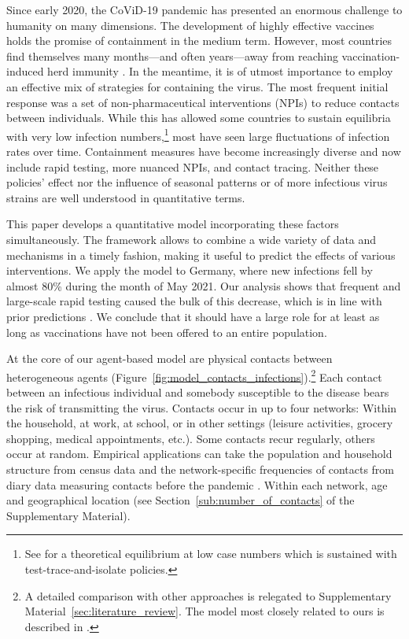 Since early 2020, the CoViD-19 pandemic has
presented an enormous challenge to humanity on many dimensions. The development of highly
effective vaccines holds the promise of containment in the medium term. However, most
countries find themselves many months---and often years---away from reaching
vaccination-induced herd immunity \citep{Swaminathan2021}. In the meantime, it is of utmost
importance to employ an effective mix of strategies for containing the virus. The most
frequent initial response was a set of non-pharmaceutical interventions (NPIs) to reduce
contacts between individuals. While this has allowed some countries to sustain equilibria
with very low infection numbers,\footnote{See \citet{Contreras2021} for a theoretical
equilibrium at low case numbers which is sustained with test-trace-and-isolate policies.}
most have seen large fluctuations of infection rates over time. Containment measures have
become increasingly diverse and now include rapid testing, more nuanced NPIs, and contact
tracing. Neither these policies' effect nor the influence of seasonal patterns or of more
infectious virus strains are well understood in quantitative terms.

This paper develops a quantitative model incorporating these factors simultaneously. The
framework allows to combine a wide variety of data and mechanisms in a timely fashion,
making it useful to predict the effects of various interventions. We apply the model to
Germany, where new infections fell by almost 80\% during the month of May 2021. Our
analysis shows that frequent and large-scale rapid testing caused the bulk of this
decrease, which is in line with prior predictions \citep{Mina2021}. We conclude that it
should have a large role for at least as long as vaccinations have not been offered to
an entire population.

At the core of our agent-based model are physical contacts between heterogeneous agents
(Figure~\ref{fig:model_contacts_infections}).\footnote{A detailed comparison with other
approaches  is relegated to Supplementary Material~\ref{sec:literature_review}. The model
most closely related to ours is described in \citet{Hinch2020}.} Each contact between an
infectious individual and somebody susceptible to the disease bears the risk of
transmitting the virus. Contacts occur in up to four networks: Within the household, at
work, at school, or in other settings (leisure activities, grocery shopping, medical
appointments, etc.). Some contacts recur regularly, others occur at random. Empirical
applications can take the population and household structure from census data and the
network-specific frequencies of contacts from diary data measuring contacts before the
pandemic \citep[e.g.][]{Mossong2008,Hoang2019}. Within each network,
age and
geographical location (see Section~\ref{sub:number_of_contacts} of the Supplementary
Material).

